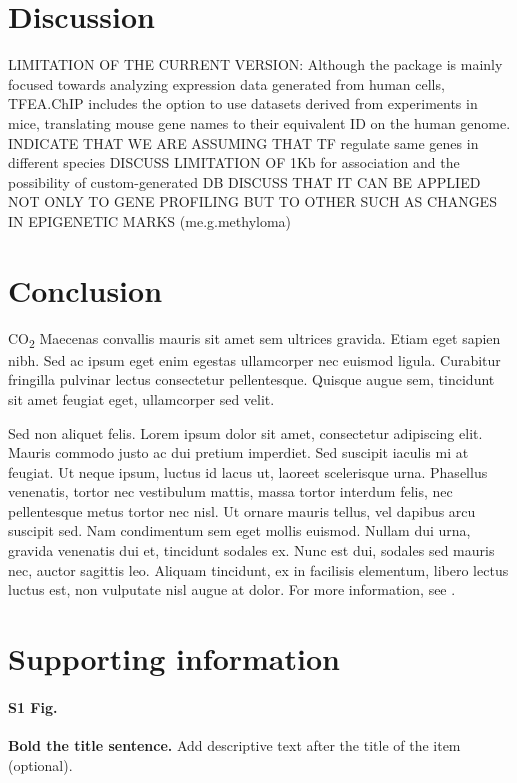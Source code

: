 \documentclass[10pt,letterpaper]{article}
\begin{document}
	\section*{Discussion}
	LIMITATION OF THE CURRENT VERSION: Although the package is mainly focused towards analyzing expression data generated from human cells, TFEA.ChIP includes the option to use datasets derived from experiments in mice, translating mouse gene names to their equivalent ID on the human genome. INDICATE THAT WE ARE ASSUMING THAT TF regulate same genes in different species
	DISCUSS LIMITATION OF 1Kb for association and the possibility of custom-generated DB
	DISCUSS THAT IT CAN BE APPLIED NOT ONLY TO GENE PROFILING BUT TO OTHER SUCH AS CHANGES IN EPIGENETIC MARKS (me.g.methyloma)
	\section*{Conclusion}
	
	CO\textsubscript{2} Maecenas convallis mauris sit amet sem ultrices gravida. Etiam eget sapien nibh. Sed ac ipsum eget enim egestas ullamcorper nec euismod ligula. Curabitur fringilla pulvinar lectus consectetur pellentesque. Quisque augue sem, tincidunt sit amet feugiat eget, ullamcorper sed velit. 
	
	Sed non aliquet felis. Lorem ipsum dolor sit amet, consectetur adipiscing elit. Mauris commodo justo ac dui pretium imperdiet. Sed suscipit iaculis mi at feugiat. Ut neque ipsum, luctus id lacus ut, laoreet scelerisque urna. Phasellus venenatis, tortor nec vestibulum mattis, massa tortor interdum felis, nec pellentesque metus tortor nec nisl. Ut ornare mauris tellus, vel dapibus arcu suscipit sed. Nam condimentum sem eget mollis euismod. Nullam dui urna, gravida venenatis dui et, tincidunt sodales ex. Nunc est dui, sodales sed mauris nec, auctor sagittis leo. Aliquam tincidunt, ex in facilisis elementum, libero lectus luctus est, non vulputate nisl augue at dolor. For more information, see .
	
	\section*{Supporting information}
	
	\paragraph*{S1 Fig.}
	\label{S1_Fig}
	{\bf Bold the title sentence.} Add descriptive text after the title of the item (optional).
	
\end{document}
